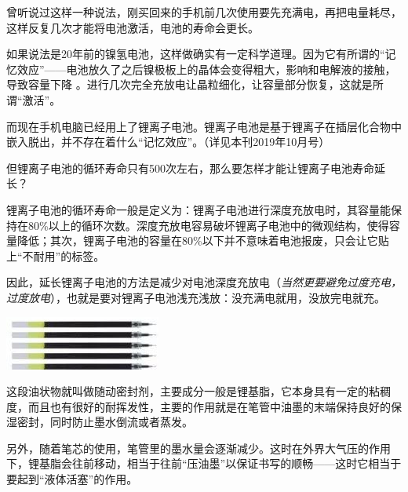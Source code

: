 \begin{multicols}{3}
\noindent{}

曾听说过这样一种说法，刚买回来的手机前几次使用要先充满电，再把电量耗尽，这样反复几次才能将电池激活，电池的寿命会更长。

如果说法是20年前的镍氢电池，这样做确实有一定科学道理。因为它有所谓的“记忆效应”——电池放久了之后镍极板上的晶体会变得粗大，影响和电解液的接触，导致容量下降 。进行几次完全充放电让晶粒细化，让容量部分恢复，这就是所谓“激活”。

而现在手机电脑已经用上了锂离子电池。锂离子电池是基于锂离子在插层化合物中嵌入脱出，并不存在着什么“记忆效应”。（{\kaishu 详见本刊2019年10月号}）

但锂离子电池的循环寿命只有500次左右，那么要怎样才能让锂离子电池寿命延长？

锂离子电池的循环寿命一般是定义为：锂离子电池进行深度充放电时，其容量能保持在80\%以上的循环次数。深度充放电容易破坏锂离子电池中的微观结构，使得容量降低；其次，锂离子电池的容量在80\%以下并不意味着电池报废，只会让它贴上“不耐用”的标签。

因此，延长锂离子电池的方法是减少对电池深度充放电（\textit{当然更要避免过度充电，过度放电}），也就是要对锂离子电池浅充浅放：没充满电就用，没放完电就充。

\noindent{}

\noindent\includegraphics[angle=90,width=\linewidth,clip=true,trim=40 0 0 0]{IMG/201912/image11}
 
这段油状物就叫做随动密封剂，主要成分一般是锂基脂，它本身具有一定的粘稠度，而且也有很好的耐挥发性，主要的作用就是在笔管中油墨的末端保持良好的保湿密封，同时防止墨水倒流或者蒸发。

另外，随着笔芯的使用，笔管里的墨水量会逐渐减少。这时在外界大气压的作用下，锂基脂会往前移动，相当于往前“压油墨”以保证书写的顺畅——这时它相当于要起到“液体活塞”的作用。

\noindent{}


\end{multicols}
